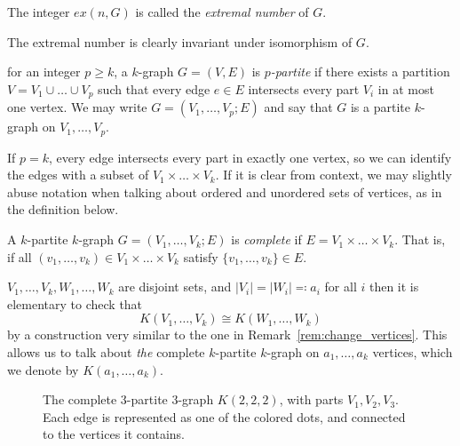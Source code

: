 \begin {definition}
    The integer $ex(n, G)$ is called the \emph{extremal number} of $G$.
\end{definition}

\begin{remark}
    The extremal number is clearly invariant under isomorphism of $G$.
\end{remark}

\begin{definition}
    for an integer $p \geq k$, a $k$-graph $G = (V, E)$ is \emph{$p$-partite}
    if there exists a partition $V = V_1 \cup \dots \cup V_p$
    such that every edge $e \in E$ intersects every part $V_i$ in at most one vertex.
    We may write $G = (V_1, \dots, V_p; E)$ and say that
    $G$ is a partite $k$-graph on $V_1, \dots, V_p$.
\end{definition}


\begin{remark}\label{rem:ordered}
    If $p=k$, every edge intersects every part in exactly one vertex,
    so we can identify the edges with a subset of $ V_1 \times \dots \times V_k$.
    If it is clear from context, we may slightly abuse notation when talking about ordered and
    unordered sets of vertices, as in the definition below.
\end{remark}

\begin{definition}
    A $k$-partite $k$-graph $G = (V_1, \dots, V_k; E)$ is \emph{complete}
    if $E = V_1 \times \dots \times V_k$.
    That is, if all $(v_1, \dots, v_k) \in V_1 \times \dots \times V_k$
    satisfy $\{v_1, \dots, v_k\} \in E$.
\end{definition}

\begin{remark}
    $V_1, \dots, V_k, W_1, \dots, W_k$ are disjoint sets,
    and $|V_i| = |W_i| \eqqcolon a_i$ for all $i$ then it is elementary to check that
    \[
        K(V_1, \dots, V_k) \cong K(W_1, \dots, W_k)
    \]
    by a construction very similar to the one in Remark~\ref{rem:change_vertices}.
    This allows us to talk about \emph{the} complete $k$-partite $k$-graph on
    $a_1, \dots, a_k$ vertices, which we denote by $K(a_1, \dots, a_k)$.
\end{remark}

\begin{figure}[H]
    \centering
    
    \caption{The complete 3-partite 3-graph $K(2, 2, 2)$, with parts $V_1, V_2, V_3$.
    Each edge is represented as one of the colored dots, and connected to the vertices it contains.}
    \label{fig:222}
\end{figure}

